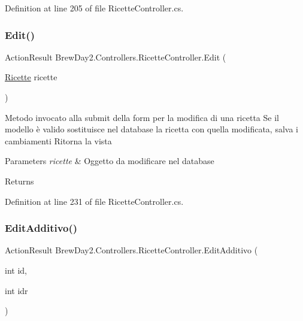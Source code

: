 Definition at line 205 of file Ricette\+Controller.\+cs.

\mbox{\label{class_brew_day2_1_1_controllers_1_1_ricette_controller_a735f22cf3e622b6017c9454115263e3c}} 
\subsubsection{\texorpdfstring{Edit()}{Edit()}\hspace{0.1cm}{\footnotesize\ttfamily [2/2]}}
{\footnotesize\ttfamily Action\+Result Brew\+Day2.\+Controllers.\+Ricette\+Controller.\+Edit (\begin{DoxyParamCaption}\item[{\mbox{\hyperlink{class_brew_day2_1_1_models_1_1_ricette}{Ricette}}}]{ricette }\end{DoxyParamCaption})}



Metodo invocato alla submit della form per la modifica di una ricetta Se il modello è valido sostituisce nel database la ricetta con quella modificata, salva i cambiamenti Ritorna la vista 


\begin{DoxyParams}{Parameters}
{\em ricette} & Oggetto da modificare nel database\\
\hline
\end{DoxyParams}
\begin{DoxyReturn}{Returns}

\end{DoxyReturn}


Definition at line 231 of file Ricette\+Controller.\+cs.

\mbox{\label{class_brew_day2_1_1_controllers_1_1_ricette_controller_a20536843bedae3acf20ec4a9991666da}} 
\subsubsection{\texorpdfstring{Edit\+Additivo()}{EditAdditivo()}\hspace{0.1cm}{\footnotesize\ttfamily [1/2]}}
{\footnotesize\ttfamily Action\+Result Brew\+Day2.\+Controllers.\+Ricette\+Controller.\+Edit\+Additivo (\begin{DoxyParamCaption}\item[{int}]{id,  }\item[{int}]{idr }\end{DoxyParamCaption})}



